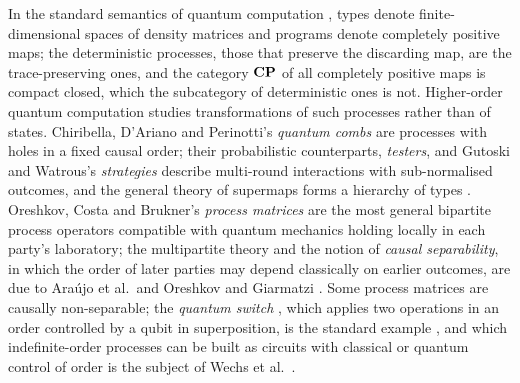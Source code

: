 In the standard semantics of quantum computation \cite{QPL_SELINGER_2004,PQP_Coecke_Kissinger_2017}, types denote finite-dimensional spaces of density matrices and programs denote completely positive maps; the deterministic processes, those that preserve the discarding map, are the trace-preserving ones, and the category $\mathbf{CP}$ of all completely positive maps is compact closed, which the subcategory of deterministic ones is not. Higher-order quantum computation studies transformations of such processes rather than of states. Chiribella, D'Ariano and Perinotti's \emph{quantum combs} \cite{quantum_circuit_architecture_Chiribella_2008,chiribella2009networks} are processes with holes in a fixed causal order; their probabilistic counterparts, \emph{testers}, and Gutoski and Watrous's \emph{strategies} \cite{gutoski2007games} describe multi-round interactions with sub-normalised outcomes, and the general theory of supermaps forms a hierarchy of types \cite{bisio2019hoqt}. Oreshkov, Costa and Brukner's \emph{process matrices} \cite{oreshkov2012noncausal} are the most general bipartite process operators compatible with quantum mechanics holding locally in each party's laboratory; the multipartite theory and the notion of \emph{causal separability}, in which the order of later parties may depend classically on earlier outcomes, are due to Araújo et al.\ and Oreshkov and Giarmatzi \cite{araujo2015witnessing,oreshkov2016separable}. Some process matrices are causally non-separable; the \emph{quantum switch} \cite{chiribella2013switch}, which applies two operations in an order controlled by a qubit in superposition, is the standard example \cite{araujo2015witnessing}, and which indefinite-order processes can be built as circuits with classical or quantum control of order is the subject of Wechs et al.\ \cite{wechs2021qcqc}.

